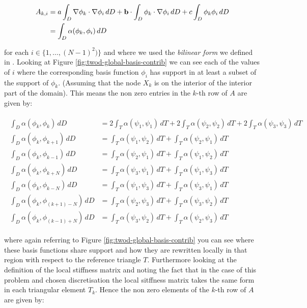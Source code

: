 \begin{align}
  \begin{split}
    A_{k,i} &= a\int_D\nabla\phi_k\cdot\nabla\phi_i\, dD
            + \mathbf{b} \cdot \int_D\phi_k\cdot\nabla\phi_i\, dD
            + c\int_D\phi_k\phi_i\, dD \\
            &= \int_D\alpha(\phi_k,\phi_i)\, dD
  \end{split}
\end{align}

for each $i \in \{1,\ldots,(N-1)^2)\}$ and where we used the \textit{bilinear
form} we defined in . Looking at Figure
\ref{fig:twod-global-basis-contrib} we can see each of the values of $i$ where
the corresponding basis function $\phi_i$ has support in at least a subset of
the support of $\phi_k$. (Assuming that the node $X_k$ is on the interior of
the interior part of the domain).  This means the non zero entries in the
$k$-th row of $A$ are given by:

\begin{align}
  \begin{split}
      \int_D\alpha(\phi_k,\phi_k)\, dD
        &= 2\int_T\alpha(\psi_1,\psi_1)\, dT + 2\int_T\alpha(\psi_2,\psi_2)\, dT
         + 2\int_T\alpha(\psi_3,\psi_3)\, dT \\
      \int_D\alpha(\phi_k,\phi_{k+1})\, dD
          &= \int_T\alpha(\psi_1,\psi_2)\, dT + \int_T\alpha(\psi_2,\psi_1)\, dT \\
      \int_D\alpha(\phi_k,\phi_{k-1})\, dD
          &= \int_T\alpha(\psi_2,\psi_1)\, dT + \int_T\alpha(\psi_1,\psi_2)\, dT \\
      \int_D\alpha(\phi_k,\phi_{k+N})\, dD
          &= \int_T\alpha(\psi_3,\psi_1)\, dT + \int_T\alpha(\psi_1,\psi_3)\, dT \\
      \int_D\alpha(\phi_k,\phi_{k-N})\, dD
          &= \int_T\alpha(\psi_1,\psi_3)\, dT + \int_T\alpha(\psi_3,\psi_1)\, dT \\
      \int_D\alpha(\phi_k,\phi_{(k+1) - N})\, dD
          &= \int_T\alpha(\psi_2,\psi_3)\, dT + \int_T\alpha(\psi_3,\psi_2)\, dT \\
      \int_D\alpha(\phi_k,\phi_{(k-1) + N})\, dD
          &= \int_T\alpha(\psi_3,\psi_2)\, dT + \int_T\alpha(\psi_2,\psi_3)\, dT
  \end{split}
\end{align}

where again referring to Figure \ref{fig:twod-global-basis-contrib} you can see
where these basis functions share support and how they are rewritten locally in
that region with respect to the reference triangle $T$. Furthermore looking at
the definition of the local stiffness matrix 
and noting the fact that in the case of this problem and chosen discretisation
the local sitffness matrix takes the same form in each triangular element
$T_k$. Hence the non zero elements of the $k$-th row of $A$ are given by:

